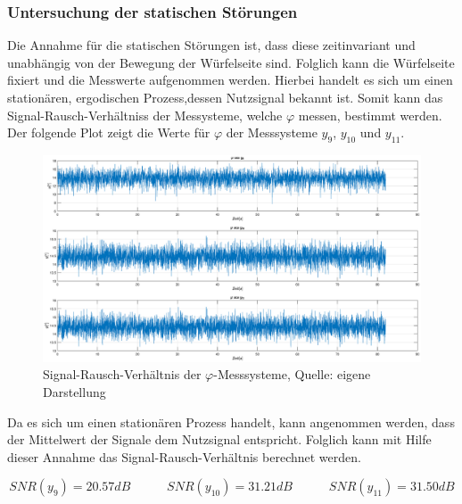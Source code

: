 \subsubsection{Untersuchung der statischen Störungen}
Die Annahme für die statischen Störungen ist, dass diese zeitinvariant und unabhängig von der Bewegung der Würfelseite sind. Folglich kann die Würfelseite fixiert und die Messwerte aufgenommen werden. Hierbei handelt es sich um einen stationären, ergodischen Prozess,dessen Nutzsignal bekannt ist. Somit kann das Signal-Rausch-Verhältniss der Messysteme, welche $\varphi$ messen, bestimmt werden. Der folgende Plot zeigt die Werte für $\varphi$ der Messsysteme $y_9$, $y_10$ und $y_11$.

\begin{figure}[h!]
\centering
\includegraphics[width=\linewidth]{3_Sensorik/img/snr_phi_plot}
\caption{Signal-Rausch-Verhältnis der $\varphi$-Messsysteme, Quelle: eigene Darstellung}
\end{figure}

Da es sich um einen stationären Prozess handelt, kann angenommen werden, dass der Mittelwert der Signale dem Nutzsignal entspricht. Folglich kann mit Hilfe dieser Annahme das Signal-Rausch-Verhältnis berechnet werden. 

\begin{equation}
SNR(y_9) = 20.57dB \hspace{35pt}  SNR(y_{10}) = 31.21dB \hspace{35pt} SNR(y_{11})=31.50dB
\end{equation}

